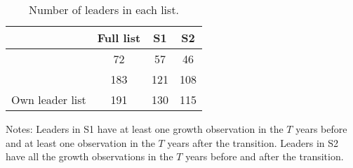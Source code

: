 \begin{table}[h]
\centering
\caption{Number of leaders in each list.}
\label{tab:number_leaders}
\begin{threeparttable}
\begin{tabular}{lccc}
\hline \hline
         & Full list & S1  & S2  \\ \hline
\cite{jones2004leaders}      & 72        & 57  & 46  \\
\cite{besley2011educated}      & 183       & 121 & 108 \\
Own leader list & 191       & 130 & 115 \\ \hline \hline
\end{tabular}
\begin{tablenotes}
	\footnotesize{Notes: Leaders in S1 have at least one growth observation in the $T$ years before and at least one observation in the $T$ years after the transition. Leaders in S2 have all the growth observations in the $T$ years before and after the transition.}
\end{tablenotes}
\end{threeparttable}
\end{table}